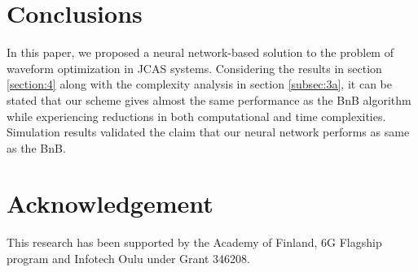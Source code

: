 \documentclass[conference]{IEEEtran}
\newcommand{\mybibliography}{}
\begin{document}
\section{Conclusions}
\label{section:5}
In this paper, we proposed a neural network-based solution to the problem of waveform optimization in JCAS systems. Considering the results in section \ref{section:4} along with the complexity analysis in section \ref{subsec:3a}, it can be stated that our scheme gives almost the same performance as the BnB algorithm while experiencing reductions in both computational and time complexities. %
Simulation results validated the claim that our neural network performs as same as the BnB.%

\section*{Acknowledgement}
This research has been supported by the Academy of Finland, 6G Flagship program and Infotech Oulu under Grant 346208.


\mybibliography

\vspace{12pt}
\end{document}
